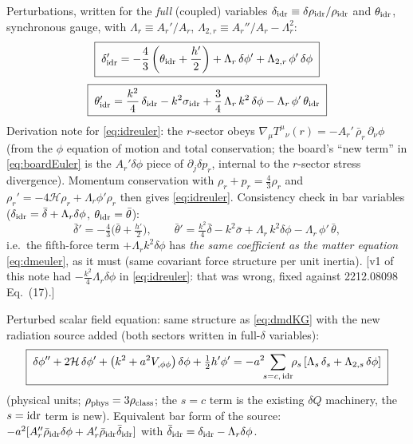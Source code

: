 \documentclass[11pt]{article}
\newcommand{\rhob}{\bar\rho}
\newcommand{\Ar}{A_{r}}
\newcommand{\cH}{\mathcal{H}}
\begin{document}
Perturbations, written for the \emph{full} (coupled) variables
$\delta_{\rm idr}\equiv\delta\rho_{\rm idr}/\rho_{\rm idr}$ and $\theta_{\rm idr}$,
synchronous gauge, with
$\Lambda_r \equiv \Ar'/\Ar$, $\Lambda_{2,r}\equiv \Ar''/\Ar-\Lambda_r^2$:
\begin{align}
\boxed{\;
\delta_{\rm idr}' = -\frac43\left(\theta_{\rm idr}+\frac{h'}{2}\right)
+\Lambda_r\,\delta\phi'
+\Lambda_{2,r}\,\phi'\,\delta\phi
\;}
\label{eq:idrcont}
\end{align}
\begin{align}
\boxed{\;
\theta_{\rm idr}' = \frac{k^{2}}{4}\,\delta_{\rm idr}
- k^{2}\sigma_{\rm idr}
+ \frac34\,\Lambda_r\,k^{2}\,\delta\phi
- \Lambda_r\,\phi'\,\theta_{\rm idr}
\;}
\label{eq:idreuler}
\end{align}
Derivation note for \eqref{eq:idreuler}: the $r$-sector obeys
$\nabla_\mu T^{\mu}{}_{\nu}(r) = -\Ar'\,\rhob_r\,\partial_\nu\phi$
(from the $\phi$ equation of motion and total conservation; the board's
``new term'' in \eqref{eq:boardEuler} is the $\Ar'\delta\phi$ piece of
$\partial_j\delta p_r$, internal to the $r$-sector stress divergence).
Momentum conservation with $\rho_r+p_r=\tfrac43\rho_r$ and
$\rho_r'=-4\cH\rho_r+\Lambda_r\phi'\rho_r$ then gives \eqref{eq:idreuler}.
Consistency check in bar variables ($\delta_{\rm idr}=\bar\delta+\Lambda_r\delta\phi$,
$\theta_{\rm idr}=\bar\theta$):
\begin{equation}
\bar\delta'=-\tfrac43\big(\bar\theta+\tfrac{h'}{2}\big),
\qquad
\bar\theta'=\tfrac{k^2}{4}\bar\delta-k^2\bar\sigma
+\Lambda_r\,k^2\delta\phi-\Lambda_r\,\phi'\,\bar\theta ,
\end{equation}
i.e.\ the fifth-force term $+\Lambda_r k^2\delta\phi$ has \emph{the same
coefficient as the matter equation} \eqref{eq:dmeuler}, as it must
(same covariant force structure per unit inertia).
[v1 of this note had $-\tfrac{k^2}{4}\Lambda_r\delta\phi$ in
\eqref{eq:idreuler}: that was wrong, fixed against 2212.08098 Eq.~(17).]

Perturbed scalar field equation: same structure as \eqref{eq:dmdKG} with the new
radiation source added (both sectors written in full-$\delta$ variables):
\begin{equation}
\boxed{\;
\delta\phi''+2\cH\,\delta\phi'+\left(k^{2}+a^{2}V_{,\phi\phi}\right)\delta\phi
+\tfrac12 h'\phi'
= -a^{2}\!\!\sum_{s=c,\,{\rm idr}}\!\!\rho_s\left[\Lambda_s\,\delta_s
+ \Lambda_{2,s}\,\delta\phi\right]
\;}
\label{eq:dKG}
\end{equation}
(physical units; $\rho_{\rm phys}=3\rho_{\rm class}$; the $s=c$ term is the
existing $\delta Q$ machinery, the $s={\rm idr}$ term is new). Equivalent bar form
of the source: $-a^2[\Ar''\rhob_{\rm idr}\delta\phi+\Ar'\rhob_{\rm idr}\bar\delta_{\rm idr}]$
with $\bar\delta_{\rm idr}=\delta_{\rm idr}-\Lambda_r\delta\phi$.
\end{document}
